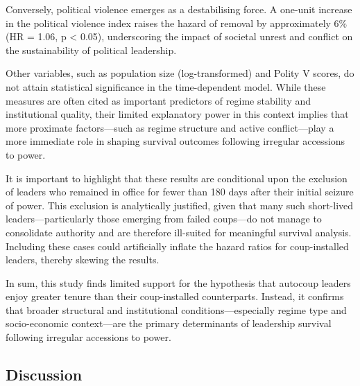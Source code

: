 \documentclass[
  12pt,
]{report}
\begin{document}
Conversely, political violence emerges as a destabilising force. A
one-unit increase in the political violence index raises the hazard of
removal by approximately \(6\%\) (HR = 1.06, p \textless{} 0.05),
underscoring the impact of societal unrest and conflict on the
sustainability of political leadership.

Other variables, such as population size (log-transformed) and Polity V
scores, do not attain statistical significance in the time-dependent
model. While these measures are often cited as important predictors of
regime stability and institutional quality, their limited explanatory
power in this context implies that more proximate factors---such as
regime structure and active conflict---play a more immediate role in
shaping survival outcomes following irregular accessions to power.

It is important to highlight that these results are conditional upon the
exclusion of leaders who remained in office for fewer than 180 days
after their initial seizure of power. This exclusion is analytically
justified, given that many such short-lived leaders---particularly those
emerging from failed coups---do not manage to consolidate authority and
are therefore ill-suited for meaningful survival analysis. Including
these cases could artificially inflate the hazard ratios for
coup-installed leaders, thereby skewing the results.

In sum, this study finds limited support for the hypothesis that
autocoup leaders enjoy greater tenure than their coup-installed
counterparts. Instead, it confirms that broader structural and
institutional conditions---especially regime type and socio-economic
context---are the primary determinants of leadership survival following
irregular accessions to power.

\subsection*{Discussion}\label{discussion}
\end{document}
